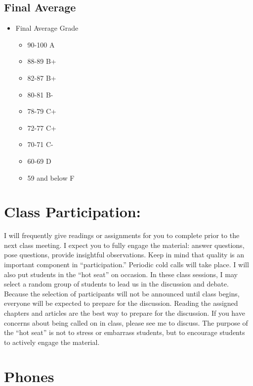 \documentclass[
]{book}
\providecommand{\tightlist}{%
  \setlength{\itemsep}{0pt}\setlength{\parskip}{0pt}}
\begin{document}
\hypertarget{final-average}{%
\subsection*{Final Average}\label{final-average}}

\begin{itemize}
\tightlist
\item
  Final Average Grade

  \begin{itemize}
  \tightlist
  \item
    90-100 A
  \item
    88-89 B+
  \item
    82-87 B+
  \item
    80-81 B-
  \item
    78-79 C+
  \item
    72-77 C+
  \item
    70-71 C-
  \item
    60-69 D
  \item
    59 and below F
  \end{itemize}
\end{itemize}

\hypertarget{class-participation}{%
\section*{Class Participation:}\label{class-participation}}

I will frequently give readings or assignments for you to complete prior to the next class meeting. I expect you to fully engage the material: answer questions, pose questions, provide insightful observations. Keep in mind that quality is an important component in ``participation.'' Periodic cold calls will take place. I will also put students in the ``hot seat'' on occasion. In these class sessions, I may select a random group of students to lead us in the discussion and debate. Because the selection of participants will not be announced until class begins, everyone will be expected to prepare for the discussion. Reading the assigned chapters and articles are the best way to prepare for the discussion. If you have concerns about being called on in class, please see me to discuss. The purpose of the ``hot seat'' is not to stress or embarrass students, but to encourage students to actively engage the material.

\hypertarget{phones}{%
\section*{Phones}\label{phones}}
\end{document}
